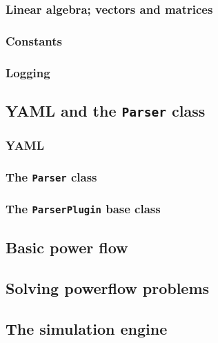 \documentclass[10pt]{article}
\begin{document}
\subsubsection{Linear algebra; vectors and matrices}
\subsubsection{Constants}
\subsubsection{Logging}
\subsection{YAML and the \texttt{Parser} class}
\subsubsection{YAML}
\subsubsection{The \texttt{Parser} class}
\subsubsection{The \texttt{ParserPlugin} base class}
\subsection{Basic power flow}
\subsection{Solving powerflow problems}
\subsection{The simulation engine}
\end{document}
